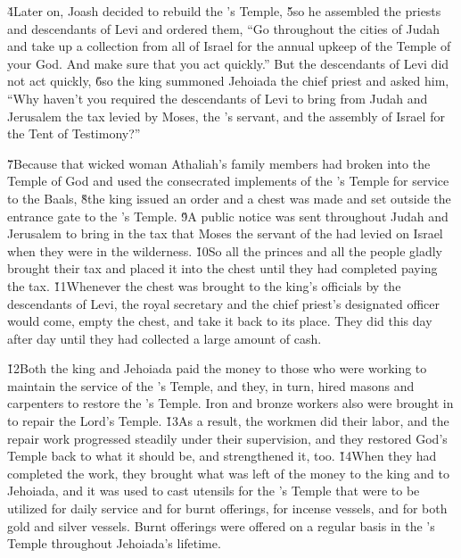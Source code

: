 \v{4}Later on, Joash decided to rebuild the 's Temple, \v{5}so he assembled the priests and descendants of Levi and ordered them, ``Go throughout the cities of Judah and take up a collection from all of Israel for the annual upkeep of the Temple of your God. And make sure that you act quickly.'' But the descendants of Levi did not act quickly, \v{6}so the king summoned Jehoiada the chief priest and asked him, ``Why haven't you required the descendants of Levi to bring from Judah and Jerusalem the tax levied by Moses, the 's servant, and the assembly of Israel for the Tent of Testimony?''

\v{7}Because that wicked woman Athaliah's family members had broken into the Temple of God and used the consecrated implements of the 's Temple for service to the Baals, \v{8}the king issued an order and a chest was made and set outside the entrance gate to the 's Temple. \v{9}A public notice was sent throughout Judah and Jerusalem to bring in the tax that Moses the servant of the  had levied on Israel when they were in the wilderness. \v{10}So all the princes and all the people gladly brought their tax and placed it into the chest until they had completed paying the tax. \v{11}Whenever the chest was brought to the king's officials by the descendants of Levi, the royal secretary and the chief priest's designated officer would come, empty the chest, and take it back to its place. They did this day after day until they had collected a large amount of cash.

\v{12}Both the king and Jehoiada paid the money to those who were working to maintain the service of the 's Temple, and they, in turn, hired masons and carpenters to restore the 's Temple. Iron and bronze workers also were brought in to repair the Lord's Temple. \v{13}As a result, the workmen did their labor, and the repair work progressed steadily under their supervision, and they restored God's Temple back to what it should be, and strengthened it, too. \v{14}When they had completed the work, they brought what was left of the money to the king and to Jehoiada, and it was used to cast utensils for the 's Temple that were to be utilized for daily service and for burnt offerings, for incense vessels, and for both gold and silver vessels. Burnt offerings were offered on a regular basis in the 's Temple throughout Jehoiada's lifetime.

